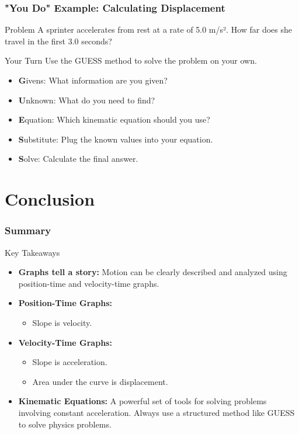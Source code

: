 \documentclass{beamer}
\begin{document}
\begin{frame}[allowframebreaks]
\frametitle{"You Do" Example: Calculating Displacement}
\begin{block}{Problem}
A sprinter accelerates from rest at a rate of 5.0 m/s². How far does she travel in the first 3.0 seconds?
\end{block}

\begin{block}{Your Turn}
Use the GUESS method to solve the problem on your own.
\begin{itemize}
    \item \textbf{G}ivens: What information are you given?
    \item \textbf{U}nknown: What do you need to find?
    \item \textbf{E}quation: Which kinematic equation should you use?
    \item \textbf{S}ubstitute: Plug the known values into your equation.
    \item \textbf{S}olve: Calculate the final answer.
\end{itemize}
\end{block}
\end{frame}

\section{Conclusion}

\begin{frame}[allowframebreaks]
\frametitle{Summary}
\begin{block}{Key Takeaways}
\begin{itemize}
    \item \textbf{Graphs tell a story:} Motion can be clearly described and analyzed using position-time and velocity-time graphs.
    \item \textbf{Position-Time Graphs:}
    \begin{itemize}
        \item Slope is velocity.
    \end{itemize}
    \item \textbf{Velocity-Time Graphs:}
    \begin{itemize}
        \item Slope is acceleration.
        \item Area under the curve is displacement.
    \end{itemize}
    \item \textbf{Kinematic Equations:} A powerful set of tools for solving problems involving constant acceleration. Always use a structured method like GUESS to solve physics problems.
\end{itemize}
\end{block}
\end{frame}
\end{document}

